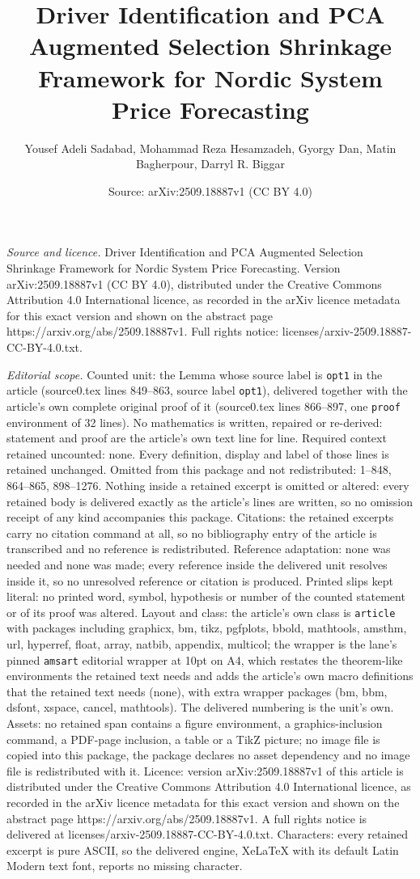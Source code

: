\documentclass[10pt,a4paper]{amsart}
\title[Driver Identification and PCA Augmented Selection Shrinkage ]{Driver Identification and PCA Augmented Selection Shrinkage Framework for Nordic System Price Forecasting}
\author{Yousef Adeli Sadabad, Mohammad Reza Hesamzadeh, Gyorgy Dan, Matin Bagherpour, Darryl R. Biggar}
\date{Source: arXiv:2509.18887v1 (CC BY 4.0)}
\begin{document}
\maketitle

\noindent\emph{Source and licence.} Driver Identification and PCA Augmented Selection Shrinkage Framework for Nordic System Price Forecasting. Version arXiv:2509.18887v1 (CC BY 4.0), distributed under the Creative Commons Attribution 4.0 International licence, as recorded in the arXiv licence metadata for this exact version and shown on the abstract page https://arxiv.org/abs/2509.18887v1. Full rights notice: licenses/arxiv-2509.18887-CC-BY-4.0.txt.\par\smallskip

\noindent\textit{Editorial scope.} Counted unit: the Lemma whose source label is \texttt{opt1} in the article (source0.tex lines 849--863, source label \texttt{opt1}), delivered together with the article's own complete original proof of it (source0.tex lines 866--897, one \texttt{proof} environment of 32 lines). No mathematics is written, repaired or re-derived: statement and proof are the article's own text line for line. Required context retained uncounted: none. Every definition, display and label of those lines is retained unchanged. Omitted from this package and not redistributed: 1--848, 864--865, 898--1276. Nothing inside a retained excerpt is omitted or altered: every retained body is delivered exactly as the article's lines are written, so no omission receipt of any kind accompanies this package. Citations: the retained excerpts carry no citation command at all, so no bibliography entry of the article is transcribed and no reference is redistributed. Reference adaptation: none was needed and none was made; every reference inside the delivered unit resolves inside it, so no unresolved reference or citation is produced. Printed slips kept literal: no printed word, symbol, hypothesis or number of the counted statement or of its proof was altered. Layout and class: the article's own class is \texttt{article} with packages including graphicx, bm, tikz, pgfplots, bbold, mathtools, amsthm, url, hyperref, float, array, natbib, appendix, multicol; the wrapper is the lane's pinned \texttt{amsart} editorial wrapper at 10pt on A4, which restates the theorem-like environments the retained text needs and adds the article's own macro definitions that the retained text needs (none), with extra wrapper packages (bm, bbm, dsfont, xspace, cancel, mathtools). The delivered numbering is the unit's own. Assets: no retained span contains a figure environment, a graphics-inclusion command, a PDF-page inclusion, a table or a TikZ picture; no image file is copied into this package, the package declares no asset dependency and no image file is redistributed with it. Licence: version arXiv:2509.18887v1 of this article is distributed under the Creative Commons Attribution 4.0 International licence, as recorded in the arXiv licence metadata for this exact version and shown on the abstract page https://arxiv.org/abs/2509.18887v1. A full rights notice is delivered at licenses/arxiv-2509.18887-CC-BY-4.0.txt. Characters: every retained excerpt is pure ASCII, so the delivered engine, XeLaTeX with its default Latin Modern text font, reports no missing character.
\end{document}
